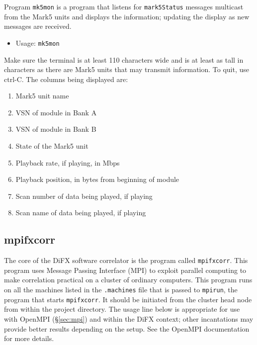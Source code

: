 Program {\tt mk5mon} is a program that listens for {\tt mark5Status} messages multicast from the Mark5 units and displays the information; updating the display as new messages are received.

\begin{itemize}
\item[] Usage: {\tt mk5mon}
\end{itemize}

Make sure the terminal is at least 110 characters wide and is at least as tall in characters as there are Mark5 units that may transmit information.
To quit, use ctrl-C.
The columns being displayed are:
\begin{enumerate}
\item Mark5 unit name
\item VSN of module in Bank A
\item VSN of module in Bank B
\item State of the Mark5 unit
\item Playback rate, if playing, in Mbps
\item Playback position, in bytes from beginning of module
\item Scan number of data being played, if playing
\item Scan name of data being played, if playing
\end{enumerate}








\subsection{mpifxcorr} \label{sec:mpifxcorr}

The core of the DiFX software correlator is the program called {\tt mpifxcorr}.
This program uses Message Passing Interface (MPI) to exploit parallel computing to make correlation practical on a cluster of ordinary computers.
This program runs on all the machines listed in the {\tt .machines} file that is passed to {\tt mpirun}, the program that starts {\tt mpifxcorr}.
It should be initiated from the cluster head node from within the project directory.
The usage line below is appropriate for use with OpenMPI (\S\ref{sec:mpi}) and within the DiFX context; other incantations may provide better results depending on the setup.
See the OpenMPI documentation for more details.

